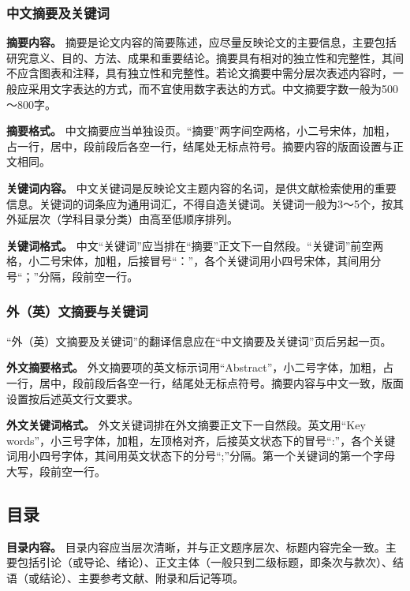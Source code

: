 \documentclass[doublesided]{Style/ucasthesis}%
\begin{document}
\hypertarget{section-17}{%
\subsubsection{中文摘要及关键词}\label{section-17}}

\textbf{摘要内容。} 摘要是论文内容的简要陈述，应尽量反映论文的主要信息，主要包括研究意义、目的、方法、成果和重要结论。摘要具有相对的独立性和完整性，其间不应含图表和注释，具有独立性和完整性。若论文摘要中需分层次表述内容时，一般应采用文字表达的方式，而不宜使用数字表达的方式。中文摘要字数一般为500～800字。

\textbf{摘要格式。} 中文摘要应当单独设页。``摘要''两字间空两格，小二号宋体，加粗，占一行，居中，段前段后各空一行，结尾处无标点符号。摘要内容的版面设置与正文相同。

\textbf{关键词内容。} 中文关键词是反映论文主题内容的名词，是供文献检索使用的重要信息。关键词的词条应为通用词汇，不得自造关键词。关键词一般为3～5个，按其外延层次（学科目录分类）由高至低顺序排列。

\textbf{关键词格式。} 中文``关键词''应当排在``摘要''正文下一自然段。``关键词''前空两格，小二号宋体，加粗，后接冒号``：''，各个关键词用小四号宋体，其间用分号``；''分隔，段前空一行。

\hypertarget{section-18}{%
\subsubsection{外（英）文摘要与关键词}\label{section-18}}

``外（英）文摘要及关键词''的翻译信息应在``中文摘要及关键词''页后另起一页。

\textbf{外文摘要格式。} 外文摘要项的英文标示词用``Abstract''，小二号字体，加粗，占一行，居中，段前段后各空一行，结尾处无标点符号。摘要内容与中文一致，版面设置按后述英文行文要求。

\textbf{外文关键词格式。} 外文关键词排在外文摘要正文下一自然段。英文用``Key words''，小三号字体，加粗，左顶格对齐，后接英文状态下的冒号``:''，各个关键词用小四号字体，其间用英文状态下的分号``;''分隔。第一个关键词的第一个字母大写，段前空一行。

\hypertarget{section-19}{%
\subsection{目录}\label{section-19}}

\textbf{目录内容。} 目录内容应当层次清晰，并与正文题序层次、标题内容完全一致。主要包括引论（或导论、绪论）、正文主体（一般只到二级标题，即条次与款次）、结语（或结论）、主要参考文献、附录和后记等项。
\end{document}
